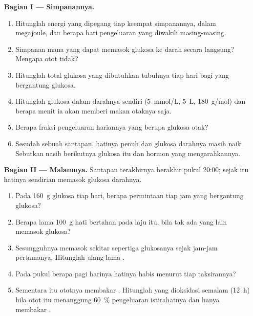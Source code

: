\begin{problem}
\medskip
\noindent\textbf{Bagian I --- Simpanannya.}
\begin{enumerate}
  \item Hitunglah energi yang dipegang tiap keempat simpanannya, dalam
        megajoule, dan berapa hari pengeluaran yang diwakili
        masing-masing.
  \item Simpanan mana yang dapat memasok glukosa ke darah secara
        langsung? Mengapa  otot tidak?
  \item Hitunglah total glukosa yang dibutuhkan tubuhnya tiap hari bagi
         yang bergantung glukosa.
  \item Hitunglah glukosa dalam darahnya sendiri (\qty{5}{mmol/L},
        \qty{5}{L}, \qty{180}{g/mol}) dan berapa menit ia akan memberi
        makan otaknya saja.
  \item Berapa fraksi pengeluaran hariannya yang berupa glukosa otak?
  \item Sesudah sebuah santapan,  hatinya penuh dan glukosa
        darahnya masih naik. Sebutkan nasib berikutnya glukosa itu dan
        hormon yang mengarahkannya.
\end{enumerate}

\medskip
\noindent\textbf{Bagian II --- Malamnya.}
Santapan terakhirnya berakhir pukul 20:00; sejak itu hatinya sendirian
memasok glukosa darahnya.
\begin{enumerate}[resume]
  \item Pada \qty{160}{g} glukosa tiap hari, berapa permintaan tiap jam
         yang bergantung glukosa?
  \item Berapa lama \qty{100}{g}  hati bertahan pada laju itu,
        bila tak ada yang lain memasok glukosa?
  \item Sesungguhnya  memasok sekitar sepertiga
        glukosanya sejak jam-jam pertamanya. Hitunglah ulang lama
        .
  \item Pada pukul berapa pagi harinya  hatinya habis menurut
        tiap taksirannya?
  \item Sementara itu ototnya membakar . Hitunglah  yang
        dioksidasi semalam (\qty{12}{h}) bila otot itu menanggung
        \qty{60}{\%} pengeluaran istirahatnya dan hanya membakar .
\end{enumerate}


\end{problem}
